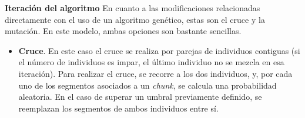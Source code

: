 \documentclass[11pt,spanish,listoffigures,listoftables]{tfgetsinf}
\begin{document}
\textbf{Iteración del algoritmo}\newline
En cuanto a las modificaciones relacionadas directamente con el uso de un algoritmo genético, estas son el cruce y la mutación. En este modelo, ambas opciones son bastante sencillas.

\begin{itemize}
    \item \textbf{Cruce}. En este caso el cruce se realiza por parejas de individuos contiguas (si el número de individuos es impar, el último individuo no se mezcla en esa iteración). Para realizar el cruce, se recorre a los dos individuos, y, por cada uno de los segmentos asociados a un \textit{chunk}, se calcula una probabilidad aleatoria. En el caso de superar un umbral previamente definido, se reemplazan los segmentos de ambos individuos entre sí.
\end{itemize}
\end{document}

